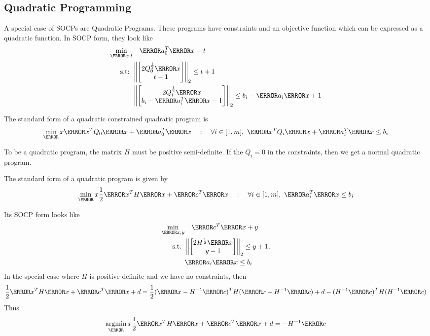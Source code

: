 \subsection{Quadratic Programming}
A special case of SOCPs are Quadratic Programs.
These programs have constraints and an objective function which can be expressed as a quadratic function.
In SOCP form, they look like
\begin{align*}
	\min_{\V{x}, t} &\quad \V{a}_0^T\V{x} + t\\
	\text{s.t: } & \left\lVert \begin{bmatrix}2Q_0^{\frac{1}{2}}\V{x}\\ t-1 \end{bmatrix}\right\rVert_2 \leq t+1\\
	& \left\lVert \begin{bmatrix}2Q_i^{\frac{1}{2}}\V{x}\\ b_i-\V{a}_i^T\V{x}-1 \end{bmatrix}\right\rVert_2 \leq b_i - \V{a}_i\V{x} + 1
\end{align*}
\begin{definition}
	The standard form of a quadratic constrained quadratic program is
	\[
		\min_\V{x} \V{x}^TQ_0\V{x} + \V{a}_0^T\V{x} \quad : \quad \forall i\in[1,m],\ \V{x}^TQ_i\V{x} + \V{a}_i^T\V{x} \leq b_i
	\]
	\label{defn:qcqp}
\end{definition}
To be a quadratic program, the matrix $H$ must be positive semi-definite.
If the $Q_i=0$ in the constraints, then we get a normal quadratic program.
\begin{definition}
	The standard form of a quadratic program is given by \[
		\min_\V{x}\frac{1}{2}\V{x}^TH\V{x} + \V{c}^T\V{x} \quad : \quad \forall i\in[1,m],\ \V{a}_i^T\V{x} \leq b_i
	\]
	\label{defn:quadratic-program}
\end{definition}
Its SOCP form looks like
\begin{align*}
	\min_{\V{x}, y} &\quad \V{c}^T\V{x} + y\\
	\text{s.t: } &\left\lVert \begin{bmatrix}2H^{\frac{1}{2}}\V{x} \\ y - 1 \end{bmatrix}\right\rVert_2 \leq y + 1,\\
	& \V{a}_i\V{x} \leq b_i
\end{align*}
In the special case where $H$ is positive definite and we have no constraints, then
\[
	\frac{1}{2}\V{x}^TH\V{x} + \V{c}^T\V{x} + d = \frac{1}{2}(\V{x} - H^{-1}\V{c})^TH(\V{x} - H^{-1}\V{c}) + d - (H^{-1}\V{c})^TH(H^{-1}\V{c})
\]
Thus \[
	\argmin_\V{x} \frac{1}{2}\V{x}^TH\V{x} + \V{c}^T\V{x} + d = -H^{-1}\V{c}
\]
